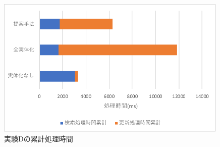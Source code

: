 \documentclass[a4paper,11pt]{ujreport}
\begin{document}
\begin{figure}[htbp]
	\begin{center}
		\includegraphics[width=30em]{src/ExperimentD-total.pdf} %
	\end{center}
	\caption{実験Dの累計処理時間}
	\label{ExperimentD-total}
\end{figure}
\end{document}
